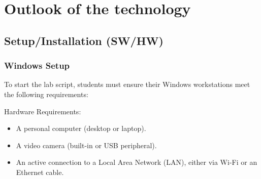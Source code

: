 \section{Outlook of the technology}

\subsection{Setup/Installation (SW/HW)}

\subsubsection{Windows Setup}
To start the lab script, students must ensure their Windows workstations meet the following requirements:

Hardware Requirements:
\begin{itemize}
    \item A personal computer (desktop or laptop).
    \item A video camera (built-in or USB peripheral).
    \item An active connection to a Local Area Network (LAN), either via Wi-Fi or an Ethernet cable.
\end{itemize}

